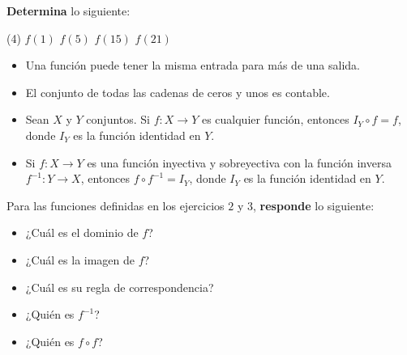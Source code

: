 \documentclass[oneside]{style}
\begin{document}
\begin{questions}[label=\protect\circled{\bfseries\arabic*}]
{        \textbf{Determina} lo siguiente:
        \begin{tasks}(4)
            \task $f(1)$
            \task $f(5)$
            \task $f(15)$
            \task $f(21)$
        \end{tasks}
    }

    \begin{itemize}
        \item Una función puede tener la misma entrada para más de una 
        salida. 

        \item El conjunto de todas las cadenas de ceros y unos es contable.
    \end{itemize}


    \begin{itemize}
        \item Sean $X$ y $Y$ conjuntos. Si $f: X \rightarrow Y$ es cualquier 
        función, entonces $I_Y \circ f = f$, donde $I_Y$ es la función 
        identidad en $Y$. 

        \item Si $f:X \rightarrow Y$ es una función inyectiva y sobreyectiva 
        con la función inversa $f^{-1}: Y \rightarrow X$, entonces 
        $f \circ f^{-1} = I_Y$, donde $I_Y$ es la función identidad en $Y$. 
    \end{itemize}

    \question
    {
        Para las funciones definidas en los ejercicios $2$ y $3$, 
        \textbf{responde} lo siguiente:
        \begin{itemize}
            \item ¿Cuál es el dominio de $f$?
            \item ¿Cuál es la imagen de $f$?
            \item ¿Cuál es su regla de correspondencia?
            \item ¿Quién es $f^{-1}$?
            \item ¿Quién es $f \circ f$?
        \end{itemize}
    }


\end{questions}
\end{document}
